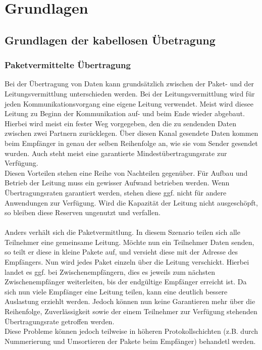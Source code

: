 
\chapter{Grundlagen}\label{Grundlagen}

\section{Grundlagen der kabellosen Übetragung}
    \subsection{Paketvermittelte Übertragung}
        Bei der Übertragung von Daten kann grundsätzlich zwischen der Paket- und der Leitungsvermittlung unterschieden 
        werden. Bei der Leitungsvermittlung wird für jeden Kommunikationsvorgang eine eigene Leitung verwendet. 
        Meist wird diesee Leitung zu Beginn der Kommunikation auf- und beim Ende wieder abgebaut. Hierbei wird
        meist ein fester Weg vorgegeben, den die zu sendenden Daten zwischen zwei Partnern zurücklegen. Über diesen Kanal
        gesendete Daten kommen beim Empfänger in genau der selben Reihenfolge an, wie sie vom Sender gesendet wurden.
        Auch steht meist eine garantierte Mindestübertragungsrate zur Verfügung. \\
        Diesen Vorteilen stehen eine Reihe von Nachteilen gegenüber. Für Aufbau und Betrieb der Leitung muss ein gewisser
        Aufwand betrieben werden. Wenn Übertragungsraten garantiert werden, stehen diese ggf. nicht für andere 
        Anwendungen zur Verfügung. Wird die Kapazität der Leitung nicht ausgeschöpft, so bleiben diese Reserven 
        ungenutzt und verfallen.\\
        \\
        Anders verhält sich die Paketvermittlung. In diesem Szenario teilen sich alle Teilnehmer eine gemeinsame
        Leitung. Möchte nun ein Teilnehmer Daten senden, so teilt er diese in kleine Pakete auf, und versieht diese
        mit der Adresse des Empfängers. Nun wird jedes Paket einzeln über die Leitung verschickt. Hierbei landet
        es ggf. bei Zwischenempfängern, dies es jeweils zum nächsten Zwischenempfänger weiterleiten, bis der
        endgültige Empfänger erreicht ist. Da sich nun viele Empfänger eine Leitung teilen, kann eine deutlich bessere
        Auslastung erziehlt werden. Jedoch können nun keine Garantieren mehr über die Reihenfolge, Zuverlässigkeit
        sowie der einem Teilnehmer zur Verfügung stehenden Übertragungsrate getroffen werden.\\
        Diese Probleme können jedoch teilweise in höheren Protokollschichten (z.B. durch Nummerierung und Umsortieren 
        der Pakete beim Empfänger) behandetl werden.

